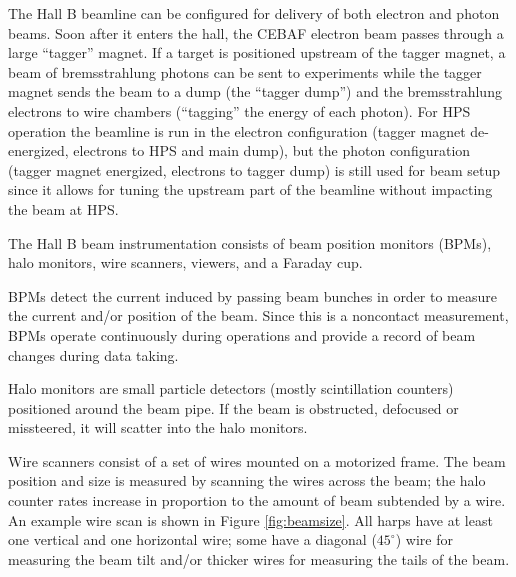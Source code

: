 The Hall B beamline can be configured for delivery of both electron and photon beams.
Soon after it enters the hall, the CEBAF electron beam passes through a large ``tagger'' magnet.
If a target is positioned upstream of the tagger magnet, a beam of bremsstrahlung photons can be sent to experiments while the tagger magnet sends the beam to a dump (the ``tagger dump'') and the bremsstrahlung electrons to wire chambers (``tagging'' the energy of each photon).
For HPS operation the beamline is run in the electron configuration (tagger magnet de-energized, electrons to HPS and main dump), but the photon configuration (tagger magnet energized, electrons to tagger dump) is still used for beam setup since it allows for tuning the upstream part of the beamline without impacting the beam at HPS.

The Hall B beam instrumentation consists of beam position monitors (BPMs), halo monitors, wire scanners, viewers, and a Faraday cup.

BPMs detect the current induced by passing beam bunches in order to measure the current and/or position of the beam.
Since this is a noncontact measurement, BPMs operate continuously during operations and provide a record of beam changes during data taking.

Halo monitors are small particle detectors (mostly scintillation counters) positioned around the beam pipe.
If the beam is obstructed, defocused or missteered, it will scatter into the halo monitors.

Wire scanners consist of a set of wires mounted on a motorized frame.
The beam position and size is measured by scanning the wires across the beam; the halo counter rates increase in proportion to the amount of beam subtended by a wire.
An example wire scan is shown in Figure \ref{fig:beamsize}.
All harps have at least one vertical and one horizontal wire; some have a diagonal ($45^\circ$) wire for measuring the beam tilt and/or thicker wires for measuring the tails of the beam.

